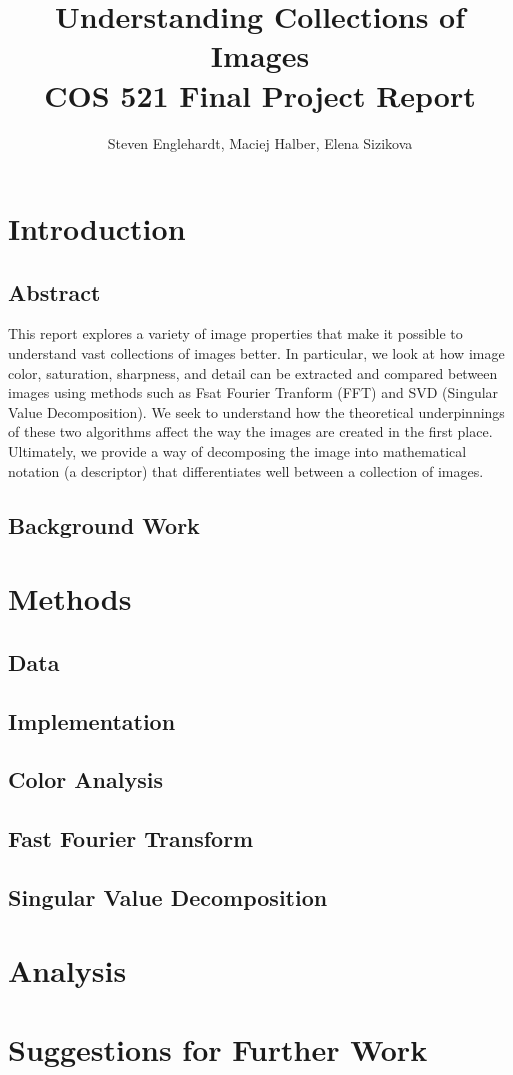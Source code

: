 \documentclass{report}
\author{Steven Englehardt, Maciej Halber, Elena Sizikova}
\title{Understanding Collections of Images \\ \small{COS 521 Final Project Report}}
\begin{document}
\maketitle
\tableofcontents

\chapter{Introduction}
\section{Abstract}
This report explores a variety of image properties that make it possible to understand vast collections of images better. In particular, we look at how image color, saturation, sharpness, and detail can be extracted and compared between images using methods such as Fsat Fourier Tranform (FFT) and SVD (Singular Value Decomposition). We seek to understand how the theoretical underpinnings of these two algorithms affect the way the images are created in the first place. Ultimately, we provide a way of decomposing the image into mathematical notation (a descriptor) that differentiates well between a collection of images.
\section{Background Work}

\chapter{Methods}
\section{Data}
\section{Implementation}
\section{Color Analysis}
\section{Fast Fourier Transform}
\section{Singular Value Decomposition}

\chapter{Analysis}

\chapter{Suggestions for Further Work}
\end{document}
